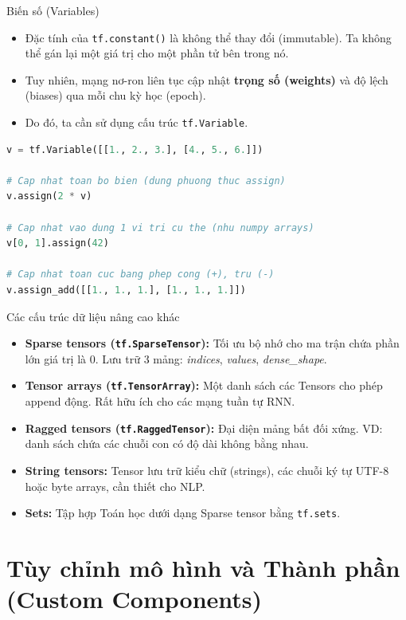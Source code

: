 \documentclass[aspectratio=169]{beamer}
\begin{document}
\begin{frame}[fragile]{Biến số (Variables)}
    \begin{itemize}
        \item Đặc tính của \texttt{tf.constant()} là không thể thay đổi (immutable). Ta không thể gán lại một giá trị cho một phần tử bên trong nó.
        \item Tuy nhiên, mạng nơ-ron liên tục cập nhật \textbf{trọng số (weights)} và độ lệch (biases) qua mỗi chu kỳ học (epoch). 
        \item Do đó, ta cần sử dụng cấu trúc \texttt{tf.Variable}.
    \end{itemize}
    \begin{lstlisting}[language=Python]
v = tf.Variable([[1., 2., 3.], [4., 5., 6.]])

# Cap nhat toan bo bien (dung phuong thuc assign)
v.assign(2 * v)

# Cap nhat vao dung 1 vi tri cu the (nhu numpy arrays)
v[0, 1].assign(42)

# Cap nhat toan cuc bang phep cong (+), tru (-)
v.assign_add([[1., 1., 1.], [1., 1., 1.]])
    \end{lstlisting}
\end{frame}

\begin{frame}{Các cấu trúc dữ liệu nâng cao khác}
    \begin{itemize}
        \item \textbf{Sparse tensors (\texttt{tf.SparseTensor}):} Tối ưu bộ nhớ cho ma trận chứa phần lớn giá trị là 0. Lưu trữ 3 mảng: \textit{indices}, \textit{values}, \textit{dense\_shape}.
        \item \textbf{Tensor arrays (\texttt{tf.TensorArray}):} Một danh sách các Tensors cho phép append động. Rất hữu ích cho các mạng tuần tự RNN.
        \item \textbf{Ragged tensors (\texttt{tf.RaggedTensor}):} Đại diện mảng bất đối xứng. VD: danh sách chứa các chuỗi con có độ dài không bằng nhau.
        \item \textbf{String tensors:} Tensor lưu trữ kiểu chữ (strings), các chuỗi ký tự UTF-8 hoặc byte arrays, cần thiết cho NLP.
        \item \textbf{Sets:} Tập hợp Toán học dưới dạng Sparse tensor bằng \texttt{tf.sets}.
    \end{itemize}
\end{frame}

\section{Tùy chỉnh mô hình và Thành phần (Custom Components)}
\end{document}
